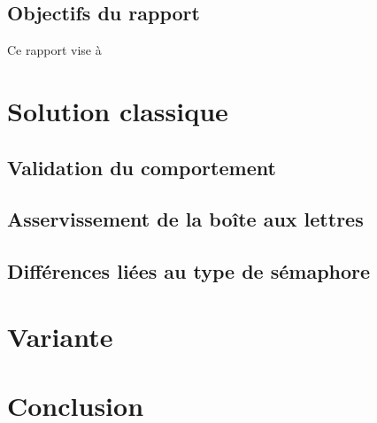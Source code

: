 \documentclass[french]{article}
\begin{document}
	
	\subsection{Objectifs du rapport}
	Ce rapport vise à 
	
	\newpage
	
	
	\section{Solution classique}
	\subsection{Validation du comportement}
	
	\subsection{Asservissement de la boîte aux lettres}	
	
	\subsection{Différences liées au type de sémaphore}
	
	\section{Variante}

	\section{Conclusion}

	
\end{document}
